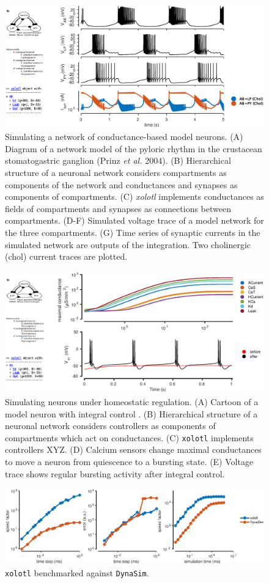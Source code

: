 \documentclass{frontiersSCNS} %
\begin{document}
\begin{figure}
	\centering
	\includegraphics[width=1.0\linewidth]{gfx/figure_network}
	\caption{Simulating a network of conductance-based model neurons. (A) Diagram of a network model of the pyloric rhythm in the crustacean stomatogastric ganglion (Prinz \textit{et al.} 2004). (B) Hierarchical structure of a neuronal network considers compartments as components of the network and conductances and synapses as components of compartments. (C) \textit{xolotl} implements conductances as fields of compartments and synapses as connections between compartments. (D-F) Simulated voltage trace of a model network for the three compartments. (G) Time series of synaptic currents in the simulated network are outputs of the integration. Two cholinergic (chol) current traces are plotted.}
	\label{fig:figurenetwork}
\end{figure}

\begin{figure}
	\centering
	\includegraphics[width=1.0\linewidth]{gfx/figure_integral_control}
	\caption{Simulating neurons under homeostatic regulation. (A) Cartoon of a model neuron \autocite{liuModelNeuronActivitydependent1998} with integral control \autocite{olearyCorrelationsIonChannel2013}. (B) Hierarchical structure of a neuronal network considers controllers as components of compartments which act on conductances. (C) \texttt{xolotl} implements controllers XYZ. (D) Calcium sensors change maximal conductances to move a neuron from quiescence to a bursting state. (E) Voltage trace shows regular bursting activity after integral control.}
	\label{fig:figureintegralcontrol}
\end{figure}

\begin{figure}
	\centering
	\includegraphics[width=1.0\linewidth]{gfx/figure_benchmark}
	\caption{\texttt{xolotl} benchmarked against \texttt{DynaSim}.}
	\label{fig:figurebenchmark}
\end{figure}
\end{document}
